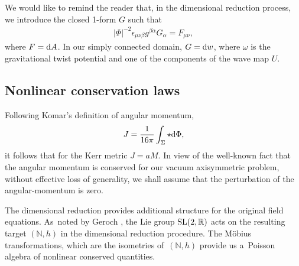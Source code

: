 \documentclass[pdftex]{sigma}
\def\eps{\epsilon}%
\def \a{\alpha}
\def \b {\beta}
\renewcommand{\a}{\alpha}
\renewcommand{\b}{\beta}
\numberwithin{equation}{section}
\begin{document}
We would like to remind the reader that, in the dimensional reduction process, we introduce the closed 1-form $G$ such that
\begin{align*}
\vert \Phi \vert^{-2} \eps_{\mu \nu \b} g^{\b \a} G_\a = F_{\mu \nu},
\end{align*}
where $F = {\rm d}A$. In our simply connected domain, $G= {\rm d}w$, where $\omega$ is the gravitational twist potential and one of the components of the wave map $U$.


\subsection*{Nonlinear conservation laws}
Following Komar's definition of angular momentum,
\begin{align*}
J = \frac{1}{16\pi} \int_{\Sigma} \star {\rm d}\Phi, %
\end{align*}
it follows that for the Kerr metric $J = a M$. In view of the well-known fact that the angular momentum is conserved for our vacuum axisymmetric problem, without effective loss of generality, we shall assume that the perturbation of the angular-momentum is zero.

The dimensional reduction provides additional structure for the original field equations. As~noted by Geroch \cite{Geroch_71}, the Lie group ${\rm SL}(2, \mathbb{R})$ acts on the resulting target $(\mathbb{N}, h)$ in the dimensional reduction procedure. The M\"obius transformations, which are the isometries of~$(\mathbb{N}, h)$ provide us a~Poisson algebra of nonlinear conserved quantities.
\end{document}
